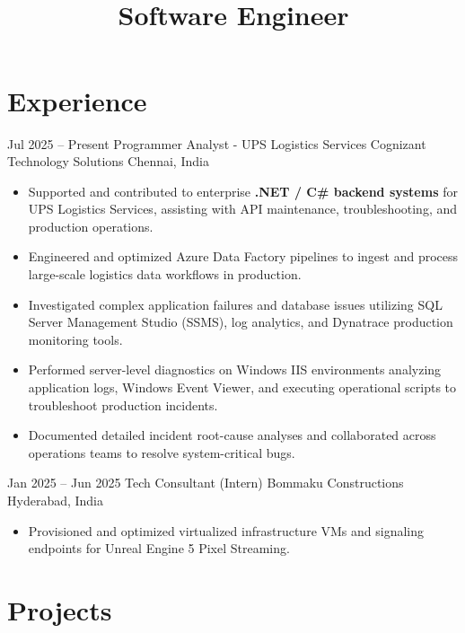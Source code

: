 \documentclass[10pt, a4paper, sans]{moderncv}
\title{\\[2mm] Software Engineer} %
\begin{document}

\makecvtitle
\vspace*{-8mm}

\section{Experience}

\cventry
  {Jul 2025 -- Present}
  {Programmer Analyst - UPS Logistics Services}
  {Cognizant Technology Solutions}
  {Chennai, India}
  {}
  {
  \begin{itemize}\setlength{\itemsep}{2pt}
    \item Supported and contributed to enterprise \textbf{.NET / C\# backend systems} for UPS Logistics Services, assisting with API maintenance, troubleshooting, and production operations.
    \item Engineered and optimized Azure Data Factory pipelines to ingest and process large-scale logistics data workflows in production.
    \item Investigated complex application failures and database issues utilizing SQL Server Management Studio (SSMS), log analytics, and Dynatrace production monitoring tools.
    \item Performed server-level diagnostics on Windows IIS environments analyzing application logs, Windows Event Viewer, and executing operational scripts to troubleshoot production incidents.
    \item Documented detailed incident root-cause analyses and collaborated across operations teams to resolve system-critical bugs.
  \end{itemize}
  }

\vspace{1mm}

\cventry
  {Jan 2025 -- Jun 2025}
  {Tech Consultant (Intern)}
  {Bommaku Constructions}
  {Hyderabad, India}
  {}
  {
  \begin{itemize}\setlength{\itemsep}{2pt}
    \item Provisioned and optimized virtualized infrastructure VMs and signaling endpoints for Unreal Engine 5 Pixel Streaming.
  \end{itemize}
  }

\section{Projects}
\end{document}
